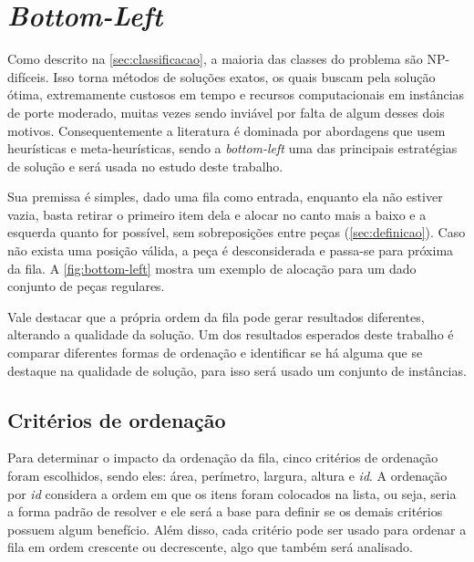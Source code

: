 \chapter{\textit{Bottom-Left}}\label{ch:bottom-left}

Como descrito na \autoref{sec:classificacao}, a maioria das classes do problema são NP-difíceis.
Isso torna métodos de soluções exatos, os quais buscam pela solução ótima, extremamente custosos em tempo e recursos computacionais em instâncias de porte moderado, muitas vezes sendo inviável por falta de algum desses dois motivos.
Consequentemente a literatura é dominada por abordagens que usem heurísticas e meta-heurísticas, sendo a \textit{bottom-left} uma das principais estratégias de solução e será usada no estudo deste trabalho.



Sua premissa é simples, dado uma fila como entrada, enquanto ela não estiver vazia, basta retirar o primeiro item dela e alocar no canto mais a baixo e a esquerda quanto for possível\cite{aprendizado-reforco}, sem sobreposições entre peças (\autoref{sec:definicao}).
Caso não exista uma posição válida, a peça é desconsiderada e passa-se para próxima da fila.
A \autoref{fig:bottom-left} mostra um exemplo de alocação para um dado conjunto de peças regulares.

Vale destacar que a própria ordem da fila pode gerar resultados diferentes, alterando a qualidade da solução.
Um dos resultados esperados deste trabalho é comparar diferentes formas de ordenação e identificar se há alguma que se destaque na qualidade de solução, para isso será usado um conjunto de instâncias.


\section{Critérios de ordenação}\label{sec:criterios-de-ordenacao}

Para determinar o impacto da ordenação da fila, cinco critérios de ordenação
foram escolhidos, sendo eles: área, perímetro, largura, altura e \textit{id}.
A ordenação por \textit{id} considera a ordem em que os itens foram colocados na lista, ou seja,
seria a forma padrão de resolver e ele será a base para definir se os demais critérios possuem
algum benefício.
Além disso, cada critério pode ser usado para ordenar a fila em ordem crescente ou decrescente,
algo que também será analisado.


